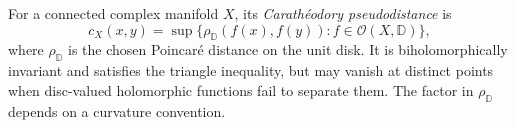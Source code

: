 
For a connected complex manifold $X$, its \emph{Carathéodory pseudodistance} is
\[
c_X(x,y)=\sup\{\rho_{\mathbb D}(f(x),f(y)):f\in\mathcal O(X,\mathbb D)\},
\]
where $\rho_{\mathbb D}$ is the chosen Poincaré distance on the unit disk. It is biholomorphically invariant and satisfies the triangle inequality, but may vanish at distinct points when disc-valued holomorphic functions fail to separate them. The factor in $\rho_{\mathbb D}$ depends on a curvature convention.
